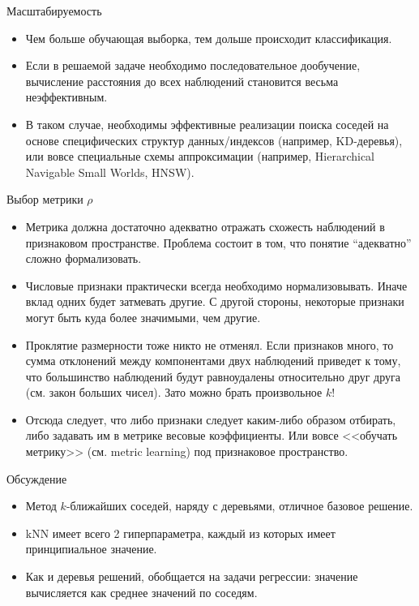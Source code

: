 \documentclass{beamer}
\begin{document}
\begin{frame}{Масштабируемость}
    \small
    \begin{itemize}
        \item Чем больше обучающая выборка, тем дольше происходит классификация.
        \item Если в решаемой задаче необходимо последовательное дообучение, вычисление расстояния до всех наблюдений становится весьма неэффективным.
        \item В таком случае, необходимы эффективные реализации поиска соседей на основе специфических структур данных/индексов (например, KD-деревья), или вовсе специальные схемы аппроксимации (например, Hierarchical Navigable Small Worlds, HNSW).
    \end{itemize}
\end{frame}

\begin{frame}{Выбор метрики $\rho$}
    \small
    \begin{itemize}
        \item Метрика должна достаточно адекватно отражать схожесть наблюдений в признаковом пространстве. Проблема состоит в том, что понятие ``адекватно'' сложно формализовать.
        \item Числовые признаки практически всегда необходимо нормализовывать. Иначе вклад одних будет затмевать другие. С другой стороны, некоторые признаки могут быть куда более значимыми, чем другие. 
        \item Проклятие размерности тоже никто не отменял. Если признаков много, то сумма отклонений между компонентами двух наблюдений приведет к тому, что большинство наблюдений будут равноудалены относительно друг друга (см. закон больших чисел). Зато можно брать произвольное $k$!
        \item Отсюда следует, что либо признаки следует каким-либо образом отбирать, либо задавать им в метрике весовые коэффициенты. Или вовсе <<обучать метрику>> (см. metric learning) под признаковое пространство.
    \end{itemize}
\end{frame}

\begin{frame}{Обсуждение}
    \small

    \begin{itemize}
        \item Метод $k$-ближайших соседей, наряду с деревьями, отличное базовое решение.
        \item kNN имеет всего 2 гиперпараметра, каждый из которых имеет принципиальное значение.
        \item Как и деревья решений, обобщается на задачи регрессии: значение вычисляется как среднее значений по соседям.
    \end{itemize}
\end{frame}
\end{document}

